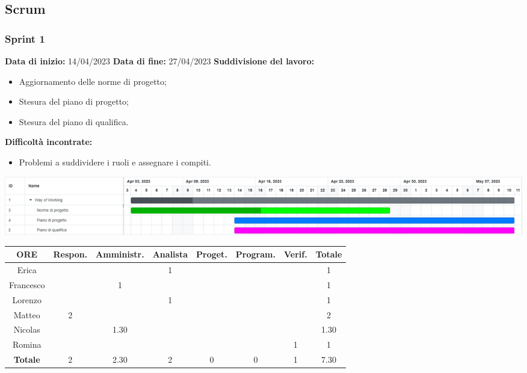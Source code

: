 \documentclass[a4paper, 12pt]{article}
\begin{document}
\subsection{Scrum}\label{Scrum}

\subsubsection{Sprint 1}
\textbf{Data di inizio:} 14/04/2023\newline
\textbf{Data di fine:} 27/04/2023\newline
\newline
\textbf{Suddivisione del lavoro:}
\begin{itemize}
    \item Aggiornamento delle norme di progetto;
    \item Stesura del piano di progetto;
    \item Stesura del piano di qualifica.
\end{itemize}
\textbf{Difficoltà incontrate:}
\begin{itemize}
    \item Problemi a suddividere i ruoli e assegnare i compiti.
\end{itemize}
\includegraphics[scale=0.24]{WoW_1.png}\newline
\newline
\begin{tabular}{|c|c|c|c|c|c|c|c|}
    \hline
    \textbf{ORE} & \textbf{Respon.} & \textbf{Amministr.} & \textbf{Analista} & \textbf{Proget.} & \textbf{Program.} & \textbf{Verif.} & \textbf{Totale}\\
    \hline
    Erica & & & 1 & & & & 1\\
    \hline
    Francesco & & 1 & & & & & 1\\
    \hline
    Lorenzo & & & 1 & & & & 1\\
    \hline
    Matteo & 2 & & & & & & 2\\
    \hline
    Nicolas & & 1.30 & & & & & 1.30\\
    \hline
    Romina & & & & & & 1 & 1\\
    \hline
    \textbf{Totale} & 2 & 2.30 & 2 & 0 & 0 & 1 & 7.30\\
    \hline
\end{tabular}\\[8pt]
\end{document}
